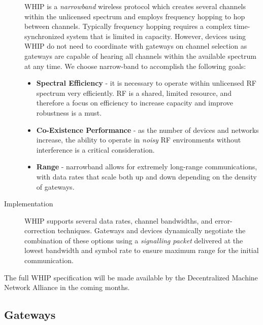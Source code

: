 \documentclass[10pt, nonatbib, nocopyrightspace, reprint]{sigplanconf}
\begin{document}
\begin{description}
    WHIP is a \emph{narrowband} wireless protocol which creates several channels within the unlicensed spectrum and employs frequency hopping to hop between channels. Typically frequency hopping requires a complex time-synchronized system that is limited in capacity. However, devices using WHIP do not need to coordinate with gateways on channel selection as gateways are capable of hearing all channels within the available spectrum at any time. We choose narrow-band to accomplish the following goals:

    \begin{itemize}
        \item \textbf{Spectral Efficiency} - it is necessary to operate within unlicensed RF spectrum very efficiently. RF is a shared, limited resource, and therefore a focus on efficiency to increase capacity and improve robustness is a must.
        \item \textbf{Co-Existence Performance} - as the number of devices and networks increase, the ability to operate in \emph{noisy} RF environments without interference is a critical consideration.
        \item \textbf{Range} - narrowband allows for extremely long-range communications, with data rates that scale both up and down depending on the density of gateways.
    \end{itemize}

    \item [Implementation] WHIP supports several data rates, channel bandwidths, and error-correction techniques. Gateways and devices dynamically negotiate the combination of these options using a \emph{signalling packet} delivered at the lowest bandwidth and symbol rate to ensure maximum range for the initial communication.
\end{description}

The full WHIP specification will be made available by the Decentralized Machine Network Alliance in the coming months.

\subsection{Gateways}\label{gateways}
\end{document}
